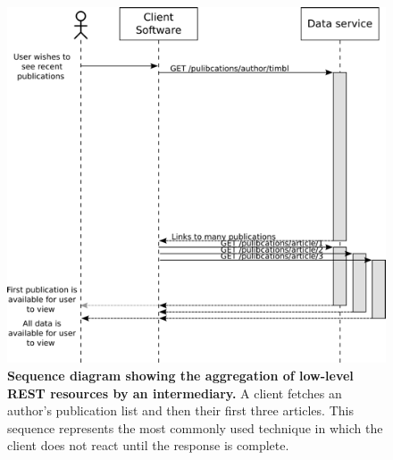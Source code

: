 \documentclass[12pt, ]{article}
\makeatletter
\def\maxwidth{\ifdim\Gin@nat@width>\linewidth\linewidth
\else\Gin@nat@width\fi}
\let\Oldincludegraphics\includegraphics
\renewcommand{\includegraphics}[1]{\Oldincludegraphics[width=\maxwidth]{#1}}
\makeatother
\begin{document}
\begin{figure}[htbp]
\centering
\includegraphics{images/rest_timeline_1.png}
\caption{\textbf{Sequence diagram showing the aggregation of low-level
REST resources by an intermediary.} A client fetches an author's
publication list and then their first three articles. This sequence
represents the most commonly used technique in which the client does not
react until the response is complete. \label{rest_timeline_1}}
\end{figure}
\end{document}
